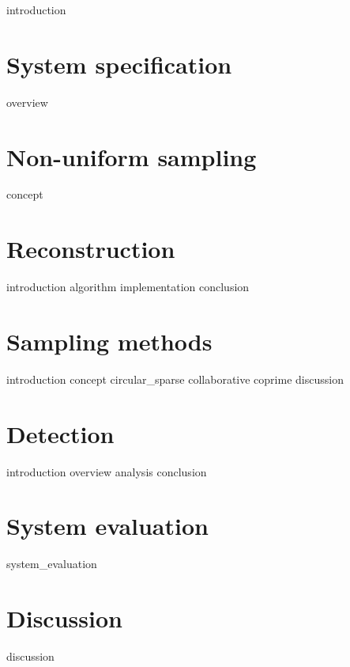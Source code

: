 \documentclass[a4paper, openany, oneside]{memoir}
\begin{document}
{introduction}

\chapter{System specification}
\label{cha:overview}
{overview}

\chapter{Non-uniform sampling}
\label{cha:sampling}
{concept}

\chapter{Reconstruction}
\label{cha:reconstruction}
{introduction}
{algorithm}
{implementation}
{conclusion}

\chapter{Sampling methods}
\label{cha:sampling_methods}
{introduction}
{concept}
{circular_sparse}
{collaborative}
{coprime}
{discussion}

\chapter{Detection}
\label{cha:detection}
{introduction}
{overview}
{analysis}
{conclusion}

\chapter{System evaluation}
\label{cha:system_evaluation_theory}
{system_evaluation}

\chapter{Discussion}
\label{cha:discussion_theory}
{discussion}
\end{document}
